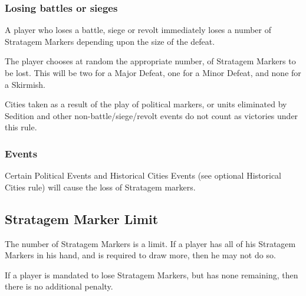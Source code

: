 \subsubsection{Losing battles or sieges}

A player who loses a battle, siege or revolt immediately loses a number of Stratagem Markers depending upon the size of the defeat.

The player chooses at random the appropriate number, of Stratagem Markers to be lost. This will be two for a Major Defeat, one for a Minor Defeat, and none for a Skirmish.

Cities taken as a result of the play of political markers, or units eliminated by Sedition and other non-battle/siege/revolt events do not count as victories under this rule.

\subsubsection{Events}

Certain Political Events and Historical Cities Events (see optional Historical Cities rule) will cause the loss of Stratagem markers.

\subsection{Stratagem Marker Limit}

The number of Stratagem Markers is a limit. If a player has all of his Stratagem Markers in his hand, and is required to draw more, then he may not do so.

If a player is mandated to lose Stratagem Markers, but has none remaining, then there is no additional penalty.
